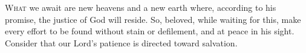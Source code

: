 
\lettrine{W}{hat} we await are new heavens and a new earth where, according to his promise, the justice of God will reside. So, beloved, while waiting for this, make every effort to be found without stain or defilement, and at peace in his sight. Consider that our Lord’s patience is directed toward salvation.